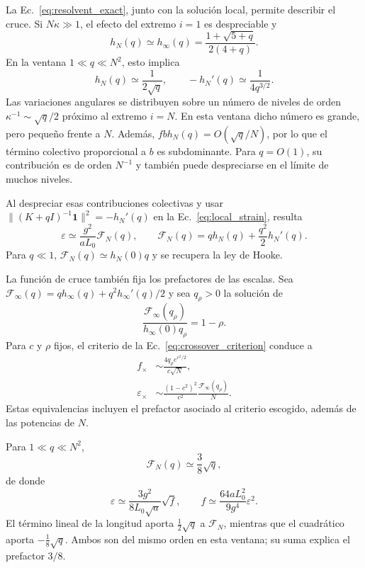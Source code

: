 \documentclass[11pt,a4paper]{article}
\begin{document}
La Ec.~\eqref{eq:resolvent_exact}, junto con la solución local,
permite describir el cruce. Si $N\kappa\gg1$, el efecto del extremo
$i=1$ es despreciable y
\begin{equation}
h_N(q)\simeq h_\infty(q)
=\frac{1+\sqrt{5+q}}{2(4+q)}.
\label{eq:resolvent_limit}
\end{equation}
En la ventana $1\ll q\ll N^2$, esto implica
\begin{equation}
h_N(q)\simeq\frac{1}{2\sqrt q},
\qquad -h_N'(q)\simeq\frac{1}{4q^{3/2}}.
\label{eq:resolvent_power}
\end{equation}
Las variaciones angulares se distribuyen sobre un número de niveles
de orden $\kappa^{-1}\sim\sqrt q/2$ próximo al extremo $i=N$.
En esta ventana dicho número es grande, pero pequeño frente a $N$.
Además, $fbh_N(q)=O(\sqrt q/N)$, por lo que el término colectivo
proporcional a $b$ es subdominante. Para $q=O(1)$, su
contribución es de orden $N^{-1}$ y también puede despreciarse
en el límite de muchos niveles.

Al despreciar esas contribuciones colectivas y usar
$\| (K+qI)^{-1}\mathbf1\|^2=-h_N'(q)$ en
la Ec.~\eqref{eq:local_strain}, resulta
\begin{equation}
\varepsilon\simeq\frac{g^2}{aL_0}\mathcal F_N(q),
\qquad
\mathcal F_N(q)=q h_N(q)+\frac{q^2}{2}h_N'(q).
\label{eq:crossover_function}
\end{equation}
Para $q\ll1$, $\mathcal F_N(q)\simeq h_N(0)q$ y se recupera
la ley de Hooke.

La función de cruce también fija los prefactores de las escalas.
Sea $\mathcal F_\infty(q)=q h_\infty(q)+q^2h_\infty'(q)/2$ y
sea $q_\rho>0$ la solución de
\begin{equation}
\frac{\mathcal F_\infty(q_\rho)}{h_\infty(0)q_\rho}=1-\rho.
\end{equation}
Para $c$ y $\rho$ fijos, el criterio de la
Ec.~\eqref{eq:crossover_criterion} conduce a
\begin{equation}
\begin{aligned}
f_\times&\sim\frac{4q_\rho e^{c^2/2}}{c\sqrt N},\\
\varepsilon_\times&\sim
\frac{(1-c^2)^2}{c^2}\frac{\mathcal F_\infty(q_\rho)}{N}.
\end{aligned}
\label{eq:crossover_prefactors}
\end{equation}
Estas equivalencias incluyen el prefactor asociado al criterio
escogido, además de las potencias de $N$.

Para $1\ll q\ll N^2$,
\begin{equation}
\mathcal F_N(q)\simeq\frac38\sqrt q,
\end{equation}
de donde
\begin{equation}
\boxed{
\varepsilon\simeq\frac{3g^2}{8L_0\sqrt a}\sqrt f,
\qquad
f\simeq\frac{64aL_0^2}{9g^4}\varepsilon^2.
}
\label{eq:nonhookean_law}
\end{equation}
El término lineal de la longitud aporta $\tfrac12\sqrt q$ a
$\mathcal F_N$, mientras que el cuadrático aporta
$-\tfrac18\sqrt q$. Ambos son del mismo orden en esta ventana;
su suma explica el prefactor $3/8$.
\end{document}
